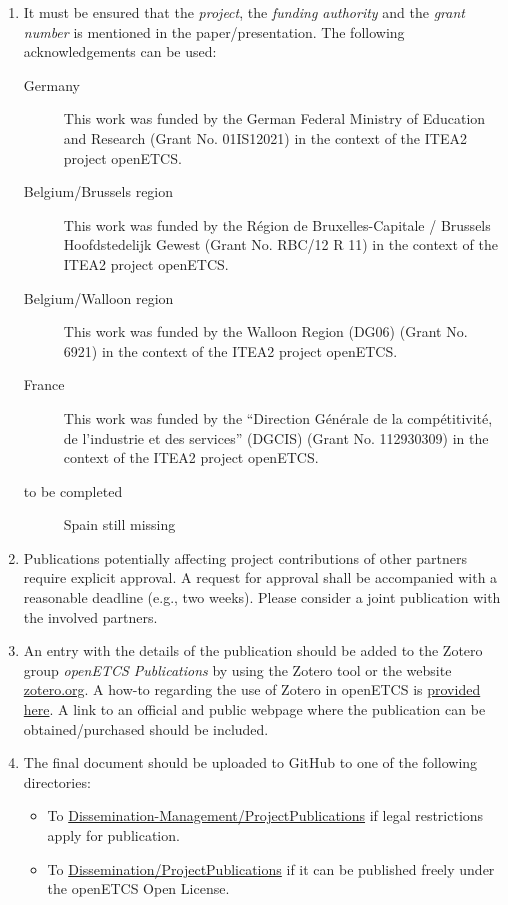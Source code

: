 \documentclass{template/openetcs_article}
\begin{document}
\begin{enumerate}
  \item  It must be ensured that the \emph{project}, the \emph{funding authority} and the \emph{grant number} is mentioned in the paper/presentation. The following acknowledgements can be used:
  \begin{description}
    \item[Germany] This work was funded by the German Federal Ministry of Education and Research (Grant No. 01IS12021) in the context of the ITEA2 project openETCS.
    \item[Belgium/Brussels region] This work was funded by the Région de Bruxelles-Capitale / Brussels Hoofdstedelijk Gewest (Grant No. RBC/12 R 11) in the context of the ITEA2 project openETCS.
    \item[Belgium/Walloon region] This work was funded by the Walloon Region (DG06) (Grant No. 6921) in the context of the ITEA2 project openETCS.
    \item[France] This work was funded by the “Direction Générale de la compétitivité, de l’industrie et des services” (DGCIS)  (Grant No. 112930309) in the context of the ITEA2 project openETCS.
    \item[to be completed] Spain still missing
  \end{description}

\item Publications potentially affecting project contributions of other partners require explicit approval. A request for approval shall be accompanied with a reasonable deadline (e.g., two weeks). Please consider a joint publication with the involved partners.

\item An entry with the details of the publication should be added to the Zotero group \emph{openETCS Publications} by using the Zotero tool or the website \href{http://www.zotero.org}{zotero.org}. A how-to regarding the use of Zotero in openETCS is \href{https://github.com/openETCS/Dissemination/wiki/Management-of-Publications-and-References-with-Zotero}{provided here}. A link to an official and public webpage where the publication can be obtained/purchased should be included.

\item The final document should be uploaded to GitHub to one of the following directories:
  \begin{itemize}
    \item To \href{https://github.com/openETCS/dissemination-management/tree/master/ProjectPublications}{Dissemination-Management/ProjectPublications} if legal restrictions apply for publication.
    \item To \href{https://github.com/openETCS/Dissemination/tree/master/ProjectPublications}{Dissemination/ProjectPublications} if it can be published freely under the openETCS Open License.
  \end{itemize}
\end{enumerate}







\end{document}
